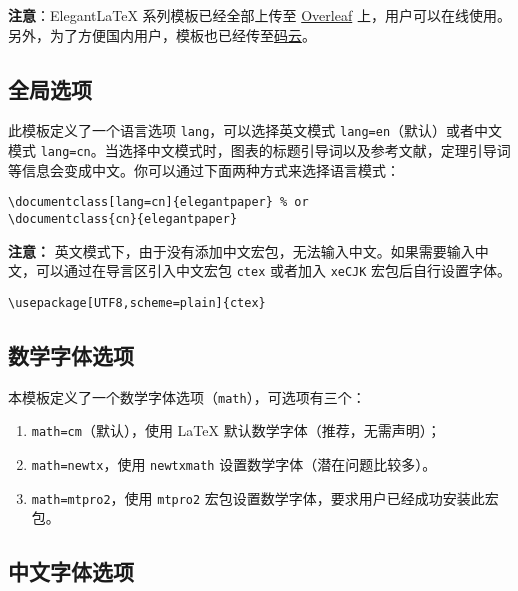 \documentclass[lang=cn,a4paper]{elegantpaper}
\begin{document}
\textbf{注意}：Elegant\LaTeX{} 系列模板已经全部上传至 \href{https://www.overleaf.com/latex/templates/elegantpaper-template/yzghrqjhmmmr}{Overleaf} 上，用户可以在线使用。另外，为了方便国内用户，模板也已经传至\href{https://gitee.com/ElegantLaTeX/ElegantPaper}{码云}。


\subsection{全局选项}
此模板定义了一个语言选项 \lstinline{lang}，可以选择英文模式 \lstinline{lang=en}（默认）或者中文模式 \lstinline{lang=cn}。当选择中文模式时，图表的标题引导词以及参考文献，定理引导词等信息会变成中文。你可以通过下面两种方式来选择语言模式：
\begin{lstlisting}
\documentclass[lang=cn]{elegantpaper} % or
\documentclass{cn}{elegantpaper} 
\end{lstlisting}

\textbf{注意：} 英文模式下，由于没有添加中文宏包，无法输入中文。如果需要输入中文，可以通过在导言区引入中文宏包 \lstinline{ctex} 或者加入 \lstinline{xeCJK} 宏包后自行设置字体。 
\begin{lstlisting}
\usepackage[UTF8,scheme=plain]{ctex}
\end{lstlisting}

\subsection{数学字体选项}

本模板定义了一个数学字体选项（\lstinline{math}），可选项有三个：
\begin{enumerate}
  \item \lstinline{math=cm}（默认），使用 \LaTeX{} 默认数学字体（推荐，无需声明）；
  \item \lstinline{math=newtx}，使用 \lstinline{newtxmath} 设置数学字体（潜在问题比较多）。
  \item \lstinline{math=mtpro2}，使用 \lstinline{mtpro2} 宏包设置数学字体，要求用户已经成功安装此宏包。
\end{enumerate}

\subsection{中文字体选项}
\end{document}
